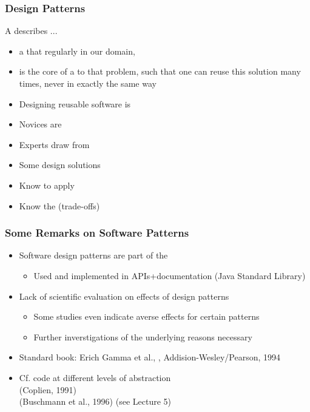 \subsubsection{Design Patterns}
A  describes ...
\begin{itemize}
    \item a  that  regularly in our domain,
    \item is the core of a  to that problem, such that one can reuse this solution many times, never in exactly the same way
\end{itemize}
\begin{itemize}
    \item Designing reusable software is 
    \item Novices are 
    \item Experts draw from 
    \item Some design solutions 
\end{itemize}
\begin{itemize}
    \item Know  to apply
    \item Know the  (trade-offs)
\end{itemize}
\subsubsection{Some Remarks on Software Patterns}
\begin{itemize}
    \item Software design patterns are part of the 
    \begin{itemize}
        \item Used and implemented in APIs+documentation (Java Standard Library)
    \end{itemize}
    \item {} Lack of scientific evaluation on effects of design patterns
    \begin{itemize}
        \item Some studies even indicate averse effects for certain patterns
        \item Further inverstigations of the underlying reasons necessary
    \end{itemize}
    \item Standard book: Erich Gamma et al., , Addision-Wesley/Pearson, 1994
    \item Cf. code  at different levels of abstraction\\
      (Coplien, 1991)\\
     (Buschmann et al., 1996) (see Lecture 5)
\end{itemize}
